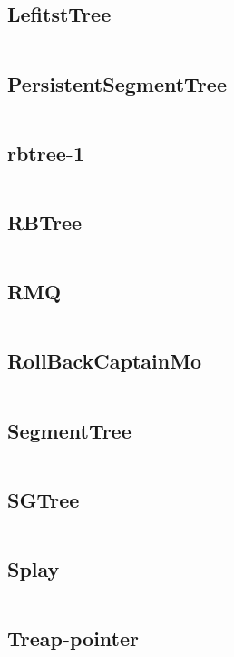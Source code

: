 \documentclass[a4]{article}
\begin{document}
\subsection{LefitstTree}
\inputminted[mathescape,linenos,numbersep=5pt,frame=lines,framesep=2mm]{cpp}{src/ds/LefitstTree.cpp}
\subsection{PersistentSegmentTree}
\inputminted[mathescape,linenos,numbersep=5pt,frame=lines,framesep=2mm]{cpp}{src/ds/PersistentSegmentTree.cpp}
\subsection{rbtree-1}
\inputminted[mathescape,linenos,numbersep=5pt,frame=lines,framesep=2mm]{cpp}{src/ds/rbtree-1.cpp}
\subsection{RBTree}
\inputminted[mathescape,linenos,numbersep=5pt,frame=lines,framesep=2mm]{cpp}{src/ds/RBTree.cpp}
\subsection{RMQ}
\inputminted[mathescape,linenos,numbersep=5pt,frame=lines,framesep=2mm]{cpp}{src/ds/RMQ.cpp}
\subsection{RollBackCaptainMo}
\inputminted[mathescape,linenos,numbersep=5pt,frame=lines,framesep=2mm]{cpp}{src/ds/RollBackCaptainMo.cpp}
\subsection{SegmentTree}
\inputminted[mathescape,linenos,numbersep=5pt,frame=lines,framesep=2mm]{cpp}{src/ds/SegmentTree.cpp}
\subsection{SGTree}
\inputminted[mathescape,linenos,numbersep=5pt,frame=lines,framesep=2mm]{cpp}{src/ds/SGTree.cpp}
\subsection{Splay}
\inputminted[mathescape,linenos,numbersep=5pt,frame=lines,framesep=2mm]{cpp}{src/ds/Splay.cpp}
\subsection{Treap-pointer}
\inputminted[mathescape,linenos,numbersep=5pt,frame=lines,framesep=2mm]{cpp}{src/ds/Treap-pointer.cpp}
\end{document}
